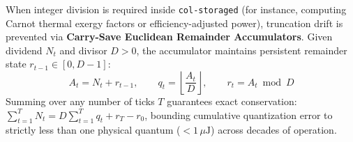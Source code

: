 When integer division is required inside \texttt{col-storaged} (for instance, computing Carnot thermal exergy factors or efficiency-adjusted power), truncation drift is prevented via \textbf{Carry-Save Euclidean Remainder Accumulators}. Given dividend $N_t$ and divisor $D > 0$, the accumulator maintains persistent remainder state $r_{t-1} \in [0, D-1]$:
\begin{equation}
A_t = N_t + r_{t-1}, \qquad q_t = \left\lfloor \frac{A_t}{D} \right\rfloor, \qquad r_t = A_t \bmod D
\label{eq:ch1-carry-save}
\end{equation}
Summing over any number of ticks $T$ guarantees exact conservation: $\sum_{t=1}^{T} N_t = D \sum_{t=1}^{T} q_t + r_T - r_0$, bounding cumulative quantization error to strictly less than one physical quantum ($< 1\,\mu\mathrm{J}$) across decades of operation.

